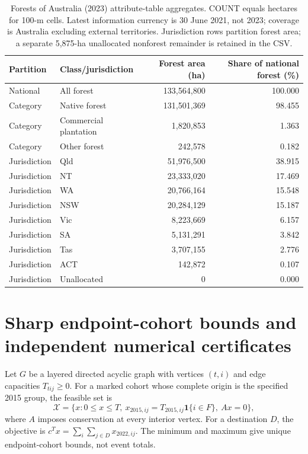 \begin{table}[htbp]
\centering\small
\caption{Forests of Australia (2023) attribute-table aggregates. COUNT equals hectares for 100-m cells. Latest information currency is 30 June 2021, not 2023; coverage is Australia excluding external territories. Jurisdiction rows partition forest area; a separate 5,875-ha unallocated nonforest remainder is retained in the CSV.}\label{tab:SI_Australia_snapshot}
\begin{tabularx}{\textwidth}{llrr}\toprule
Partition & Class/jurisdiction & Forest area (ha) & Share of national forest (\%)\\\midrule
National & All forest & 133,564,800 & 100.000\\
Category & Native forest & 131,501,369 & 98.455\\
Category & Commercial plantation & 1,820,853 & 1.363\\
Category & Other forest & 242,578 & 0.182\\
Jurisdiction & Qld & 51,976,500 & 38.915\\
Jurisdiction & NT & 23,333,020 & 17.469\\
Jurisdiction & WA & 20,766,164 & 15.548\\
Jurisdiction & NSW & 20,284,129 & 15.187\\
Jurisdiction & Vic & 8,223,669 & 6.157\\
Jurisdiction & SA & 5,131,291 & 3.842\\
Jurisdiction & Tas & 3,707,155 & 2.776\\
Jurisdiction & ACT & 142,872 & 0.107\\
Jurisdiction & Unallocated & 0 & 0.000\\
\bottomrule\end{tabularx}
\end{table}

\section{Sharp endpoint-cohort bounds and independent numerical certificates}
Let $G$ be a layered directed acyclic graph with vertices $(t,i)$ and edge capacities $T_{tij}\ge0$. For a marked cohort whose complete origin is the specified 2015 group, the feasible set is
\[
\mathcal X=\{x:0\le x\le T,\ x_{2015,ij}=T_{2015,ij}\mathbf1\{i\in F\},\ Ax=0\},
\]
where $A$ imposes conservation at every interior vertex. For a destination $D$, the objective is $c^Tx=\sum_i\sum_{j\in D}x_{2022,ij}$. The minimum and maximum give unique endpoint-cohort bounds, not event totals.

